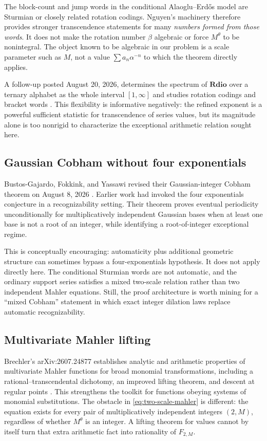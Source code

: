 \documentclass[11pt,oneside]{article}
\theoremstyle{definition}
\theoremstyle{remark}
\begin{document}
The block-count and jump words in the conditional Alaoglu--Erd\H{o}s model are Sturmian or closely related rotation codings.  Nguyen's machinery therefore provides stronger transcendence statements for many \emph{numbers formed from those words}.  It does not make the rotation number $\beta$ algebraic or force $M^\theta$ to be nonintegral.  The object known to be algebraic in our problem is a scale parameter such as $M$, not a value $\sum a_n\alpha^{-n}$ to which the theorem directly applies.

A follow-up posted August 20, 2026, determines the spectrum of $\mathbf{Rdio}$ over a ternary alphabet as the whole interval $[1,\infty]$ and studies rotation codings and bracket words \cite{NguyenSpectrum2026}.  This flexibility is informative negatively: the refined exponent is a powerful sufficient statistic for transcendence of series values, but its magnitude alone is too nonrigid to characterize the exceptional arithmetic relation sought here.

\subsection{Gaussian Cobham without four exponentials}

Bustos-Gajardo, Fokkink, and Yassawi revised their Gaussian-integer Cobham theorem on August 8, 2026 \cite{GaussianCobham2026}.  Earlier work had invoked the four exponentials conjecture in a recognizability setting.  Their theorem proves eventual periodicity unconditionally for multiplicatively independent Gaussian bases when at least one base is not a root of an integer, while identifying a root-of-integer exceptional regime.

This is conceptually encouraging: automaticity plus additional geometric structure can sometimes bypass a four-exponentials hypothesis.  It does not apply directly here.  The conditional Sturmian words are not automatic, and the ordinary support series satisfies a mixed two-scale relation rather than two independent Mahler equations.  Still, the proof architecture is worth mining for a ``mixed Cobham'' statement in which exact integer dilation laws replace automatic recognizability.

\subsection{Multivariate Mahler lifting}

Brechler's arXiv:2607.24877 establishes analytic and arithmetic properties of multivariate Mahler functions for broad monomial transformations, including a rational--transcendental dichotomy, an improved lifting theorem, and descent at regular points \cite{Brechler2026}.  This strengthens the toolkit for functions obeying systems of monomial substitutions.  The obstacle in \eqref{eq:two-scale-mahler} is different: the equation exists for every pair of multiplicatively independent integers $(2,M)$, regardless of whether $M^\theta$ is an integer.  A lifting theorem for values cannot by itself turn that extra arithmetic fact into rationality of $F_{2,M}$.
\end{document}
